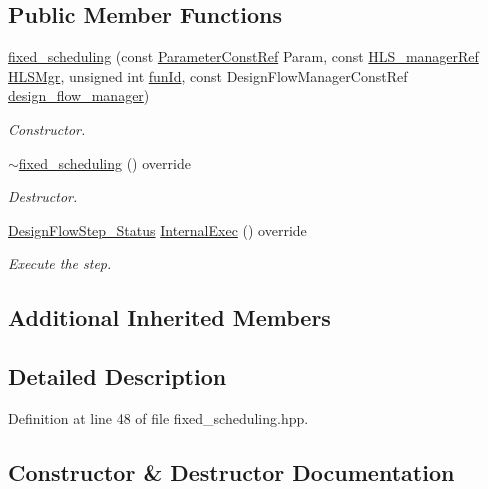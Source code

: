\subsection*{Public Member Functions}
\begin{DoxyCompactItemize}
\item 
\hyperlink{classfixed__scheduling_a1b87a754455b7f0628760539923a3405}{fixed\+\_\+scheduling} (const \hyperlink{Parameter_8hpp_a37841774a6fcb479b597fdf8955eb4ea}{Parameter\+Const\+Ref} Param, const \hyperlink{hls__manager_8hpp_acd3842b8589fe52c08fc0b2fcc813bfe}{H\+L\+S\+\_\+manager\+Ref} \hyperlink{classHLS__step_ade85003a99d34134418451ddc46a18e9}{H\+L\+S\+Mgr}, unsigned int \hyperlink{classHLSFunctionStep_a3e6434fd86c698b0c70520b859bff5b0}{fun\+Id}, const Design\+Flow\+Manager\+Const\+Ref \hyperlink{classDesignFlowStep_ab770677ddf087613add30024e16a5554}{design\+\_\+flow\+\_\+manager})
\begin{DoxyCompactList}\small\item\em Constructor. \end{DoxyCompactList}\item 
\hyperlink{classfixed__scheduling_a05b14aa177b8fb7def29ea848de939d8}{$\sim$fixed\+\_\+scheduling} () override
\begin{DoxyCompactList}\small\item\em Destructor. \end{DoxyCompactList}\item 
\hyperlink{design__flow__step_8hpp_afb1f0d73069c26076b8d31dbc8ebecdf}{Design\+Flow\+Step\+\_\+\+Status} \hyperlink{classfixed__scheduling_a7dbf0a071862208536ac8fa0803cf8d7}{Internal\+Exec} () override
\begin{DoxyCompactList}\small\item\em Execute the step. \end{DoxyCompactList}\end{DoxyCompactItemize}
\subsection*{Additional Inherited Members}


\subsection{Detailed Description}


Definition at line 48 of file fixed\+\_\+scheduling.\+hpp.



\subsection{Constructor \& Destructor Documentation}
\mbox{\label{classfixed__scheduling_a1b87a754455b7f0628760539923a3405}} 
